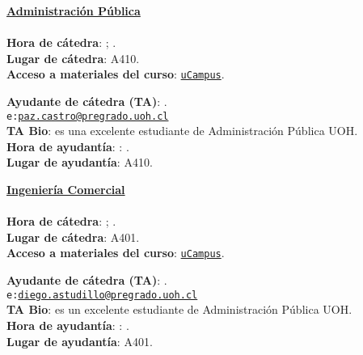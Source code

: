 \documentclass[letterpaper]{article}
\begin{document}
\vspace{5mm}
{\bf \underline{Administraci\'on P\'ublica}}
\\
\\
{\bf Hora de c\'atedra}: {\unskip}; {\unskip}.\\
{\bf Lugar de c\'atedra}: A410.\\
{\bf Acceso a materiales del curso}: \href{https://ucampus.uoh.cl/uoh/2019/1/AP1000/1/}{\texttt{uCampus}}.

\vspace{2mm}
{\bf Ayudante de c\'atedra (TA)}: {\unskip}.\\
\texttt{e:}\href{mailto:paz.castro@pregrado.uoh.cl}{\texttt{paz.castro@pregrado.uoh.cl}}\\
{\bf TA Bio}: {\unskip} es una excelente estudiante de Administraci\'on P\'ublica UOH.\\
{\bf Hora de ayudant\'ia}: {\unskip}: {\unskip}.\\
{\bf Lugar de ayudant\'ia}: A410.



\vspace{5mm}
{\bf \underline{Ingenier\'ia Comercial}}
\\
\\
{\bf Hora de c\'atedra}: {\unskip}; {\unskip}.\\
{\bf Lugar de c\'atedra}: A401.\\
{\bf Acceso a materiales del curso}: \href{https://ucampus.uoh.cl/uoh/2019/1/CO1000/1/}{\texttt{uCampus}}.


\vspace{2mm}
{\bf Ayudante de c\'atedra (TA)}: {\unskip}.\\
\texttt{e:}\href{mailto:diego.astudillo@pregrado.uoh.cl}{\texttt{diego.astudillo@pregrado.uoh.cl}}\\
{\bf TA Bio}: {\unskip} es un excelente estudiante de Administraci\'on P\'ublica UOH.\\
{\bf Hora de ayudant\'ia}: {\unskip}: {\unskip}.\\
{\bf Lugar de ayudant\'ia}: A401.
\end{document}
